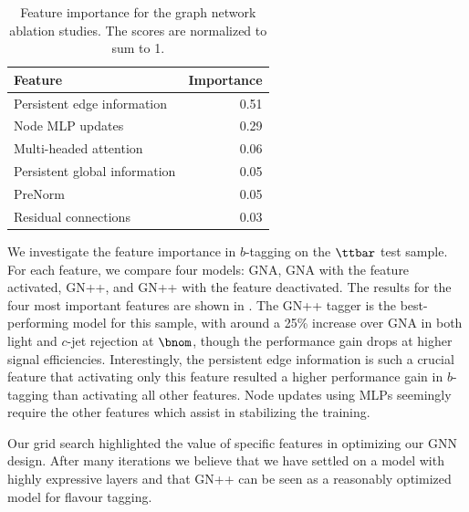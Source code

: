 \begin{table}
    \centering
    \begin{tabular}{lr}
        \toprule
        Feature & Importance \\
        \midrule
        Persistent edge information & 0.51 \\
        Node MLP updates & 0.29 \\
        Multi-headed attention & 0.06 \\
        Persistent global information & 0.05 \\
        PreNorm & 0.05 \\
        Residual connections & 0.03 \\
        \bottomrule
    \end{tabular}
    \caption{Feature importance for the graph network ablation studies. The scores are normalized to sum to 1.}
    \label{tab:feature_importance}
\end{table}

We investigate the feature importance in $b$-tagging on the $\ttbar$ test sample.
For each feature, we compare four models: GNA, GNA with the feature activated, GN++, and GN++ with the feature deactivated.
The results for the four most important features are shown in .
The GN++ tagger is the best-performing model for this sample, with around a 25\% increase over GNA in both light and $c$-jet rejection at $\bnom$, though the performance gain drops at higher signal efficiencies.
Interestingly, the persistent edge information is such a crucial feature that activating only this feature resulted a higher performance gain in $b$-tagging than activating all other features.
Node updates using MLPs seemingly require the other features which assist in stabilizing the training.

Our grid search highlighted the value of specific features in optimizing our GNN design.
After many iterations we believe that we have settled on a model with highly expressive layers and that GN++ can be seen as a reasonably optimized model for flavour tagging.

